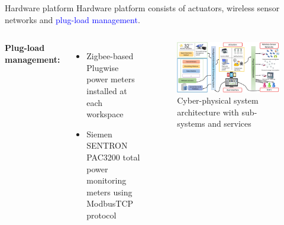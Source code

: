 \documentclass[aspectratio=169]{beamer}
\begin{document}
\begin{frame}{Hardware platform}
    Hardware platform consists of actuators, wireless sensor networks and \textcolor{blue}{plug-load management}.
    \begin{columns}
        \textbf{Plug-load management:}
        \small{
            \begin{itemize}[label=$\circ$]
                \item Zigbee-based Plugwise power meters installed at each workspace 
                \item Siemen SENTRON PAC3200 total power monitoring meters using ModbusTCP protocol
            \end{itemize}
        }
        
        \begin{figure}
            \includegraphics[scale=0.18]{pic/cyber-physical-infrastructure.png}
            \caption{\footnotesize{Cyber-physical system architecture with sub-systems and services}}
        \end{figure}
    \end{columns}
\end{frame}
\end{document}
